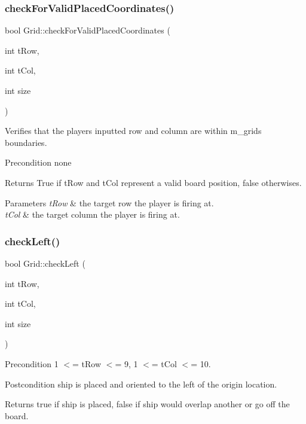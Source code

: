 \subsubsection{\texorpdfstring{check\+For\+Valid\+Placed\+Coordinates()}{checkForValidPlacedCoordinates()}}
{\footnotesize\ttfamily bool Grid\+::check\+For\+Valid\+Placed\+Coordinates (\begin{DoxyParamCaption}\item[{int}]{t\+Row,  }\item[{int}]{t\+Col,  }\item[{int}]{size }\end{DoxyParamCaption})}



Verifies that the player\textquotesingle{}s inputted row and column are within m\+\_\+grid\textquotesingle{}s boundaries. 

\begin{DoxyPrecond}{Precondition}
none 
\end{DoxyPrecond}
\begin{DoxyReturn}{Returns}
True if t\+Row and t\+Col represent a valid board position, false otherwises. 
\end{DoxyReturn}

\begin{DoxyParams}{Parameters}
{\em t\+Row} & the target row the player is firing at. \\
\hline
{\em t\+Col} & the target column the player is firing at. \\
\hline
\end{DoxyParams}
\mbox{\label{classGrid_a92d3dec9998340992f02f26dbc5036df}} 
\subsubsection{\texorpdfstring{check\+Left()}{checkLeft()}}
{\footnotesize\ttfamily bool Grid\+::check\+Left (\begin{DoxyParamCaption}\item[{int}]{t\+Row,  }\item[{int}]{t\+Col,  }\item[{int}]{size }\end{DoxyParamCaption})}

\begin{DoxyPrecond}{Precondition}
1 $<$= t\+Row $<$= 9, 1 $<$= t\+Col $<$= 10. 
\end{DoxyPrecond}
\begin{DoxyPostcond}{Postcondition}
ship is placed and oriented to the left of the origin location. 
\end{DoxyPostcond}
\begin{DoxyReturn}{Returns}
true if ship is placed, false if ship would overlap another or go off the board. 
\end{DoxyReturn}

